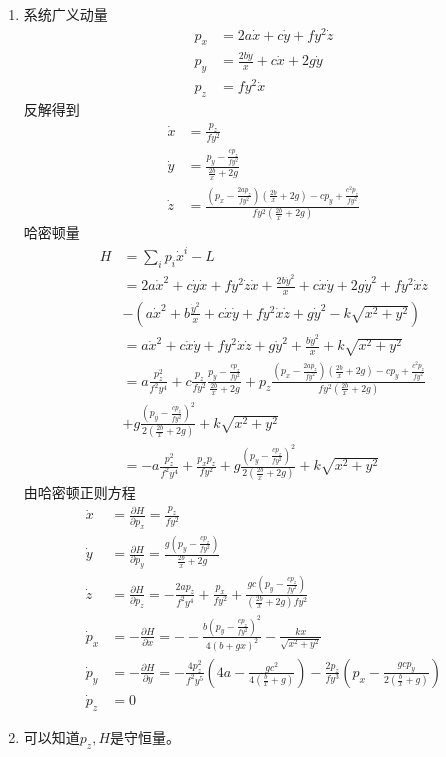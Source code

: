 \begin{solution}
    \begin{enumerate}[label=(\arabic*)]
    \item 系统广义动量
    \begin{align*}
        p_x&=2a\dot x+c\dot y+fy^2\dot z\\
        p_y&=\frac{2b\dot y}{x}+c\dot x+2g\dot y\\
        p_z&=fy^2\dot x
    \end{align*}
    反解得到
    \begin{align*}
        \dot x&=\frac{p_z}{fy^2}\\
        \dot y&=\frac{p_y-\frac{cp_z}{fy^2}}{\frac{2b}{x}+2g}\\
        \dot z&=\frac{(p_x-\frac{2ap_z}{fy^2})(\frac{2b}{x}+2g)-cp_y+\frac{c^2p_z}{fy^2}}{fy^2(\frac{2b}{x}+2g)}
    \end{align*}
    哈密顿量
    \begin{align*}
        H&=\sum_{i}p_i\dot x^i-L\\&=2a\dot x^2+c\dot y\dot x+fy^2\dot z\dot x+\frac{2b\dot y^2}{x}+c\dot x\dot y+2g\dot y^2+fy^2\dot x\dot z\\&-(a\dot x^2+b\frac{\dot y^2}{x}+c\dot x\dot y+fy^2\dot x\dot z+g\dot y^2-k\sqrt{x^2+y^2})\\&=a\dot x^2+c\dot x\dot y+fy^2\dot x\dot z+g\dot y^2+\frac{b\dot y^2}{x}+k\sqrt{x^2+y^2}\\&=a\frac{p_z^2}{f^2y^4}+c\frac{p_z}{fy^2}\frac{p_y-\frac{cp_z}{fy^2}}{\frac{2b}{x}+2g}+p_z\frac{(p_x-\frac{2ap_z}{fy^2})(\frac{2b}{x}+2g)-cp_y+\frac{c^2p_z}{fy^2}}{fy^2(\frac{2b}{x}+2g)}\\&+g\frac{(p_y-\frac{cp_z}{fy^2})^2}{2(\frac{2b}{x}+2g)}+k\sqrt{x^2+y^2}\\&=-a\frac{p_z^2}{f^2y^4}+\frac{p_xp_z}{fy^2}+g\frac{(p_y-\frac{cp_z}{fy^2})^2}{2(\frac{2b}{x}+2g)}+k\sqrt{x^2+y^2}
    \end{align*}
    由哈密顿正则方程
    \begin{align*}
        \dot x&=\frac{\partial H}{\partial p_x}=\frac{p_z}{fy^2}\\
        \dot y&=\frac{\partial H}{\partial p_y}=\frac{g(p_y-\frac{cp_z}{fy^2})}{\frac{2b}{x}+2g}\\
        \dot z&=\frac{\partial H}{\partial p_z}=-\frac{2ap_z}{f^2y^4}+\frac{p_x}{fy^2}+\frac{gc(p_y-\frac{cp_z}{fy^2})}{(\frac{2b}{x}+2g)fy^2}\\
        \dot p_x&=-\frac{\partial H}{\partial x}=--\frac{b(p_y-\frac{cp_z}{fy^2})^2}{4(b+gx)^2}-\frac{kx}{\sqrt{x^2+y^2}}\\
        \dot p_y&=-\frac{\partial H}{\partial y}=-\frac{4p_z^2}{f^2y^5}(4a-\frac{gc^2}{4(\frac bx+g)})-\frac{2p_z}{fy^3}(p_x-\frac{gcp_y}{2(\frac{b}{x}+g)})\\
        \dot p_z&=0
    \end{align*}
    \item 可以知道$p_z,H$是守恒量。
    \end{enumerate}
\end{solution}
